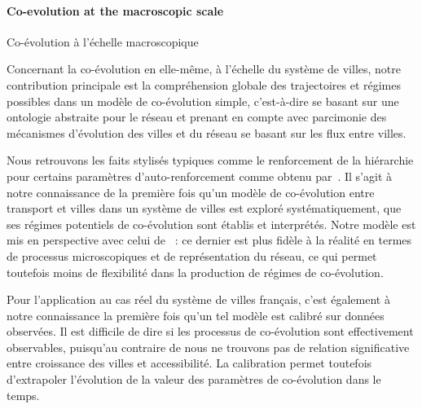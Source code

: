 \paragraph{Co-evolution at the macroscopic scale}{Co-évolution à l'échelle macroscopique}



Concernant la co-évolution en elle-même, à l'échelle du système de villes, notre contribution principale est la compréhension globale des trajectoires et régimes possibles dans un modèle de co-évolution simple, c'est-à-dire se basant sur une ontologie abstraite pour le réseau et prenant en compte avec parcimonie des mécanismes d'évolution des villes et du réseau se basant sur les flux entre villes.

Nous retrouvons les faits stylisés typiques comme le renforcement de la hiérarchie pour certains paramètres d'auto-renforcement comme obtenu par~\cite{baptistemodeling}. Il s'agit à notre connaissance de la première fois qu'un modèle de co-évolution entre transport et villes dans un système de villes est exploré systématiquement, que ses régimes potentiels de co-évolution sont établis et interprétés. Notre modèle est mis en perspective avec celui de~\cite{schmitt2014modelisation} : ce dernier est plus fidèle à la réalité en termes de processus microscopiques et de représentation du réseau, ce qui permet toutefois moins de flexibilité dans la production de régimes de co-évolution.

Pour l'application au cas réel du système de villes français, c'est également à notre connaissance la première fois qu'un tel modèle est calibré sur données observées. Il est difficile de dire si les processus de co-évolution sont effectivement observables, puisqu'au contraire de \cite{bretagnolle2003vitesse} nous ne trouvons pas de relation significative entre croissance des villes et accessibilité. La calibration permet toutefois d'extrapoler l'évolution de la valeur des paramètres de co-évolution dans le temps.




